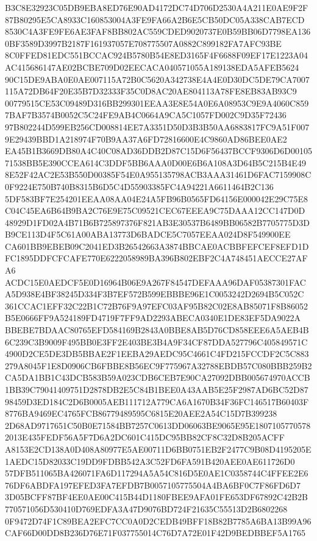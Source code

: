 \documentclass[UTF8,fontset=fandol,zihao=-4,a4paper]{ctexart}
\begin{document}
{{B3C8E32923C05DB9EBA8ED76E90AD4172DC74D706D2530A4A211E0AE9F2F87B80295E5CA8933C160853004A3FE9FA66A2B6E5CB50DC05A338CAB7ECD
8530C4A3FE9FE6AE3FAF8BB802AC559CDED9020737E0B59BB06D7798EA1360BF3589D3997B2187F161937057E708775507A0882C899182FA7AFC93BE
8C0FFED81EDC551BCCAC924B5780B54E8ED3165F4F6688F09EF17E1223A04AC415686147AE02BCBE709D02EECACA040571055A189138EDA5AFEB5624
90C15DE9ABA0E0AE007115A72B0C5620A342738E4A4E0D30DC5DE79CA7007115A72DB64F20E35B7D32333F35C0D8AC20AE804113A78FE8EB83AB93C9
00779515CE53C09489D316BB299301EEAA3E8E54A0E6A08953C9E9A4060C8597BAF7B3574B0052C5C24FE9AB4C0664A9CA5C1057FD002C9D35F72436
97B802244D599EB256CD008814EE7A3351D50D3B3B50AA6883817FC9A51F0079E29439BBD1A218974F70B9AA37A6FD72816600E4C9860AD86BEE0AE2
EA45B1B3669DB80A4C40C08AD36DDB2D87C15D6F56437BCCF9306D6D0010571538BB5E390CCEA614C3DDF5BB6AAA0D00E6B6A108A3D64B5C215B4E49
8E52F42AC2E53B550D00385F54E0A955135798ACB3AAA31461D6FAC7159908C0F9224E750B740B8315B6D5C4D55903385FC4A94221A6611464B2C136
5DF583BF7E254201EEAA08AA04E24A5FB96B0565FD64156E000042E29C75E8C04C45EA6B64B9BA2C76E9E75C09521CEC67EEEA9C75DAAA12CC147D0D
48929D1FD02A4B71B6B725897376F821AB3E30537B6489BB06582B7705775D3DB9CE113D4F5C61A00ABA13773D6BADCE5C7057EEAA024D8F549900EE
CA601BB9EBEB09C2041ED3B26542663A3874BBCAE0ACBBFEFCEF8EFD1DFC1895DDFCFCAFE770E6222058989BA396B802EBF2C4A748451AECCE27AFA6
ACDC15E0AEDCF5E0D16964B06E9A267F84547DEFAAA96DAF05387301FACA5D938E4BF38245D334F3B7EF572B599EBBBE96E1C0053242D2694B5C052C
361CCAC1EFF32C22B1C72B76F9A97EFC03AF95B82C02E8AB85071F8B86052B5E0666FF9A524189FD4719F7FF9AD2293ABECA0340E1DE83EF5DA9022A
BBEBE7BDAAC80765EFD584169B2843A0BBE8AB5D76CD858EEE6A5AEB4B6C239C3B9009F495BB0E3FF2E403BE3B4A9F34CF87DDA527796C405849571C
4900D2CE5DE3DB5BBAE2F1EEBA29AEDC95C4661C4FD215FCCDF2C5C883279A8045F1E8D0906CB6FBBE8B56EC9F775967A32788EBDB57C080BBB259B2
CA5DA1BB1C43DCB583B59A023CDB6CEB7E90CA27092DBB005674970ACCB1BB39C79041409751D2878DB2E5C84B1BEE0A43AAB5E25F2987AD6BC52D87
98459D3ED184C2D6B0005AEB111712A779CA6A1670B34F36FC146517B60403F8776BA9469EC4765FCB86779489595C6815E20AEE2A54C15D7B399238
2D68AD9717651C50B0E71584BB7257C0613DD06063BE9065E95E18071057705782013E435FEDF56A5F7D6A2DC601C415DC95BB82CF8C32D8B205ACFF
A8153E2CD138A0D408A80977E5AE00711D6BB0751EB2F2477C9B08D4195205E1AEDC15D82033C19DD9FDBB542A3C52FD6FA591B420AEE0AE611726D0
57DFB511065BA426071FA6D117294A5A54C816D5E0AE1C0358744C4FFEE2E676DF6ABDFA197EFED3FA7EFDB7B0057105775504A4BA6BF0C7F86FD6D7
3D05BCFF87BF4EE0AE00C415B44D1180FBEE9AFA01FE653DF67892C42B2B770571056D530410D769EDFA3A47D9076BD724F21635C55513D2B6802268
0F9472D74F1C89BEA2EFC7CC0A0D2CEDB49BFF18B82B7785A6BA13B99A96CAF66D00DD8B236D76E71F037755014C76D7A72E01F42D9BEDBBEF5A1765
}}
\end{document}
